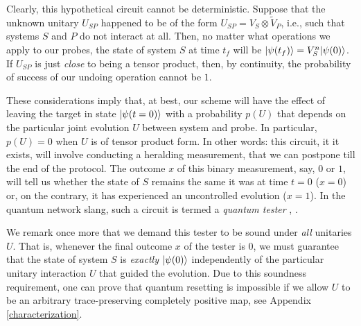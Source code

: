 \documentclass[twocolumn,prx,aps,longbibliography]{revtex4-1}
\begin{document}
Clearly, this hypothetical circuit cannot be deterministic. Suppose that the unknown unitary $U_{SP}$ happened to be of the form $U_{SP}=V_S\otimes \tilde{V}_P$, i.e., such that systems $S$ and $P$ do not interact at all. Then, no matter what operations we apply to our probes, the state of system $S$ at time $t_f$ will be $|\psi(t_f)\rangle=V_S^n|\psi(0)\rangle$. If $U_{SP}$ is just \emph{close} to being a tensor product, then, by continuity, the probability of success of our undoing operation cannot be $1$.

These considerations imply that, at best, our scheme will have the effect of leaving the target in state $|\psi(t=0)\rangle$ with a probability $p(U)$ that depends on the particular joint evolution $U$ between system and probe. In particular, $p(U)=0$ when $U$ is of tensor product form. In other words: this circuit, it it exists, will involve conducting a heralding measurement, that we can postpone till the end of the protocol. The outcome $x$ of this binary measurement, say, $0$ or $1$, will tell us whether the state of $S$ remains the same it was at time $t=0$ ($x=0$) or, on the contrary, it has experienced an uncontrolled evolution ($x=1$). In the quantum network slang, such a circuit is termed a \emph{quantum tester} \cite{tester}, \cite{tester2}. 

We remark once more that we demand this tester to be sound under \emph{all} unitaries $U$. That is, whenever the final outcome $x$ of the tester is $0$, we must guarantee that the state of system $S$ is \emph{exactly} $|\psi(0)\rangle$ independently of the particular unitary interaction $U$ that guided the evolution. Due to this soundness requirement, one can prove that quantum resetting is impossible if we allow $U$ to be an arbitrary trace-preserving completely positive map, see Appendix \ref{characterization}. 

\end{document}

